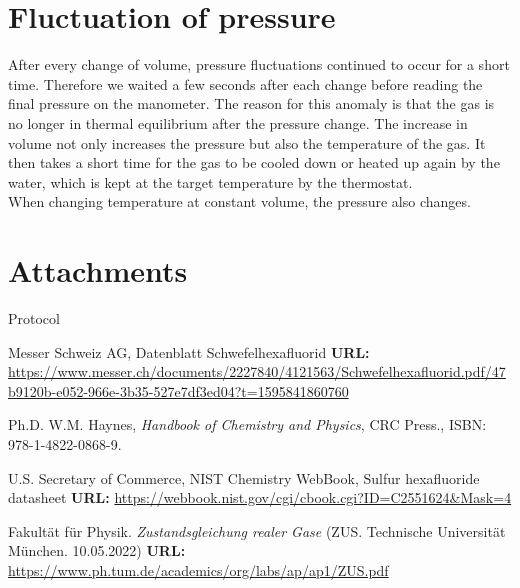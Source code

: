 \documentclass[10pt,a4paper]{article}
\begin{document}
\section{Fluctuation of pressure}

After every change of volume, pressure fluctuations continued to occur for a short time. Therefore we waited a few seconds after each change before reading the final pressure on the manometer.
The reason for this anomaly is that the gas is no longer in thermal equilibrium after the pressure change.
The increase in volume not only increases the pressure but also the temperature of the gas.
It then takes a short time for the gas to be cooled down or heated up again by the water, which is kept at the target temperature by the thermostat. \\
When changing temperature at constant volume, the pressure also changes.

\section{Attachments}
Protocol


\begin{thebibliography}{9}

  Messer Schweiz AG, Datenblatt Schwefelhexafluorid
  \textbf{URL:} \url{https://www.messer.ch/documents/2227840/4121563/Schwefelhexafluorid.pdf/47b9120b-e052-966e-3b35-527e7df3ed04?t=1595841860760}
  
  Ph.D. W.M. Haynes,
  \textit{Handbook of Chemistry and Physics},
  CRC Press.,
  ISBN: 978-1-4822-0868-9.
  
  U.S. Secretary of Commerce, NIST Chemistry WebBook, Sulfur hexafluoride datasheet
  \textbf{URL:} \url{https://webbook.nist.gov/cgi/cbook.cgi?ID=C2551624&Mask=4}  
  
  
  Fakultät für Physik. \emph{Zustandsgleichung realer Gase} (ZUS. Technische Universität München. 10.05.2022)
  \textbf{URL:} \url{https://www.ph.tum.de/academics/org/labs/ap/ap1/ZUS.pdf}
  
  
\newpage
  
\end{thebibliography}


\end{document}
